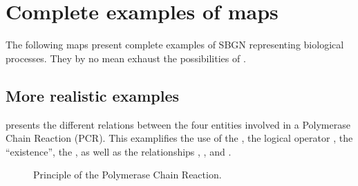 \chapter{Complete examples of \SBGNERLone maps}

The following maps present complete examples of SBGN \ERs representing biological processes. They by no mean exhaust the possibilities of  \SBGNERLone.\\



\section{More realistic examples}
 presents the different relations between the four entities involved in a Polymerase Chain Reaction (PCR). This examplifies the use of the , the logical operator , the  ``existence'', the , as well as the relationships , ,  and .

\begin{figure}[htb]
\begin{center}
\caption{Principle of the Polymerase Chain Reaction.}\label{fig:PCR}
\end{center}
\end{figure}

